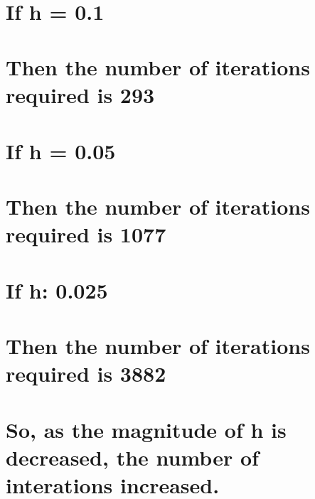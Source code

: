 \documentclass[11pt]{article}
\begin{document}
    \begin{center}
    \end{center}
    { \hspace*{\fill} \\}
    
    \hypertarget{if-h-0.1}{%
\section{If h = 0.1}\label{if-h-0.1}}

\hypertarget{then-the-number-of-iterations-required-is-293}{%
\section{Then the number of iterations required is
293}\label{then-the-number-of-iterations-required-is-293}}

\hypertarget{if-h-0.05}{%
\section{If h = 0.05}\label{if-h-0.05}}

\hypertarget{then-the-number-of-iterations-required-is-1077}{%
\section{Then the number of iterations required is
1077}\label{then-the-number-of-iterations-required-is-1077}}

\hypertarget{if-h-0.025}{%
\section{If h: 0.025}\label{if-h-0.025}}

\hypertarget{then-the-number-of-iterations-required-is-3882}{%
\section{Then the number of iterations required is
3882}\label{then-the-number-of-iterations-required-is-3882}}

    \hypertarget{so-as-the-magnitude-of-h-is-decreased-the-number-of-interations-increased.}{%
\section{So, as the magnitude of h is decreased, the number of
interations
increased.}\label{so-as-the-magnitude-of-h-is-decreased-the-number-of-interations-increased.}}
\end{document}
